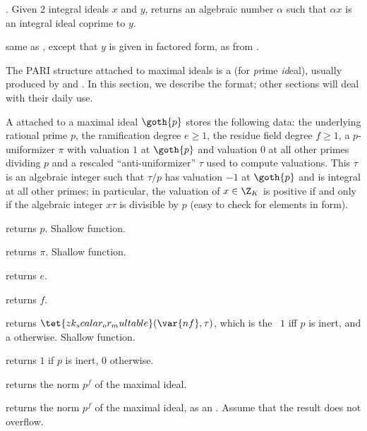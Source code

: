 . Given 2 integral ideals $x$ and
$y$, returns an algebraic number $\alpha$ such that
$\alpha x$ is an integral ideal coprime to $y$.

 same as
, except that $y$ is given in factored form, as from
.




The PARI structure attached to maximal ideals is a  (for
\emph{pr}ime \emph{id}eal), usually produced by 
and . In this section, we describe the format; other sections
will deal with their daily use.

A  attached to a maximal ideal $\goth{p}$ stores the following
data: the underlying rational prime $p$, the ramification degree $e\geq 1$,
the residue field degree $f\geq 1$, a $p$-uniformizer $\pi$ with valuation
$1$ at $\goth{p}$ and valuation $0$ at all other primes dividing $p$ and
a rescaled ``anti-uniformizer'' $\tau$ used to compute valuations. This
$\tau$ is an algebraic integer such that $\tau/p$ has valuation $-1$ at
$\goth{p}$ and is integral at all other primes; in particular,
the valuation of $x\in\Z_K$ is positive if and only if the algebraic integer
$x\tau$ is divisible by $p$ (easy to check for elements in  form).

 returns $p$. Shallow function.

 returns $\pi$. Shallow function.

 returns $e$.

 returns $f$.

 returns
$\tet{zk_scalar_or_multable}(\var{nf}, \tau)$, which is the ~$1$
iff $p$ is inert, and a  otherwise. Shallow function.

 returns $1$ if $p$ is inert, $0$ otherwise.

 returns the norm $p^f$ of the maximal ideal.

 returns the norm $p^f$ of the maximal ideal, as
an . Assume that the result does not overflow.

